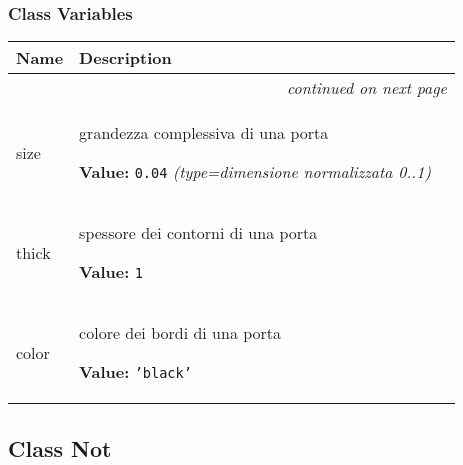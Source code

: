 
  \subsubsection{Class Variables}

    \vspace{-1cm}
\hspace{\varindent}\begin{longtable}{|p{\varnamewidth}|p{\vardescrwidth}|l}
\cline{1-2}
\cline{1-2} \centering \textbf{Name} & \centering \textbf{Description}& \\
\cline{1-2}
\endhead\cline{1-2}\multicolumn{3}{r}{\small\textit{continued on next page}}\\\endfoot\cline{1-2}
\endlastfoot\raggedright s\-i\-z\-e\- & \raggedright grandezza complessiva di una porta

\textbf{Value:} 
{\tt 0.04}            {\it (type=dimensione normalizzata 0..1)}&\\
\cline{1-2}
\raggedright t\-h\-i\-c\-k\- & \raggedright spessore dei contorni di una porta

\textbf{Value:} 
{\tt 1}&\\
\cline{1-2}
\raggedright c\-o\-l\-o\-r\- & \raggedright colore dei bordi di una porta

\textbf{Value:} 
{\tt \texttt{'}\texttt{black}\texttt{'}}&\\
\cline{1-2}
\end{longtable}



\subsection{Class Not}

